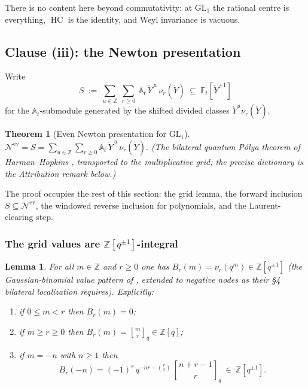\documentclass[11pt]{article}
\newtheorem{theorem}{Theorem}
\newtheorem{lemma}{Lemma}
\newcommand{\At}{\mathbb{A}_t}
\newcommand{\Ft}{\mathbb{F}_t}
\newcommand{\Nev}{\mathcal N^{\mathrm{ev}}}
\newcommand{\HC}{\operatorname{HC}}
\newcommand{\Yc}{\check Y}
\newcommand{\Z}{\mathbb Z}
\newcommand{\qbinom}[2]{\genfrac{[}{]}{0pt}{}{#1}{#2}_{q}}
\begin{document}
\noindent
There is no content here beyond commutativity: at $\mathrm{GL}_1$ the rational centre is
everything, $\HC$ is the identity, and Weyl invariance is vacuous.

\subsection{Clause (iii): the Newton presentation}

Write
\[
  S\ :=\ \sum_{u\in\Z}\ \sum_{r\ge0}\ \At\,\Yc^{\,u}\,\nu_{r}(\Yc)\ \subseteq\
  \Ft[\Yc^{\pm1}]
\]
for the $\At$-submodule generated by the shifted divided classes
$\Yc^{u}\nu_r(\Yc)$.

\begin{theorem}[Even Newton presentation for $\mathrm{GL}_1$]\label{thm:iii}
$\displaystyle \Nev=S=\sum_{u\in\Z}\sum_{r\ge0}\At\,\Yc^{\,u}\,\nu_r(\Yc).$
(The bilateral quantum P\'olya theorem of Harman--Hopkins
\cite[\S\S1,4]{HarmanHopkins}, transported to the multiplicative grid; the
precise dictionary is the Attribution remark below.)
\end{theorem}

The proof occupies the rest of this section: the grid lemma, the forward
inclusion $S\subseteq\Nev$, the windowed reverse inclusion for polynomials, and
the Laurent-clearing step.

\subsubsection{The grid values are $\Z[q^{\pm1}]$-integral}

\begin{lemma}\label{lem:grid}
For all $m\in\Z$ and $r\ge0$ one has $B_r(m)=\nu_r(q^{m})\in\Z[q^{\pm1}]$
(the Gaussian-binomial value pattern of \cite[\S1]{HarmanHopkins}, extended
to negative nodes as their \S4 bilateral localization requires).
Explicitly:
\begin{enumerate}
\item[(a)] if $0\le m<r$ then $B_r(m)=0$;
\item[(b)] if $m\ge r\ge0$ then $B_r(m)=\qbinom{m}{r}\in\Z[q]$;
\item[(c)] if $m=-n$ with $n\ge1$ then
  \[
    B_r(-n)=(-1)^{r}\,q^{-nr-\binom{r}{2}}\,\qbinom{n+r-1}{r}\ \in\ \Z[q^{\pm1}].
  \]
\end{enumerate}
\end{lemma}
\end{document}
